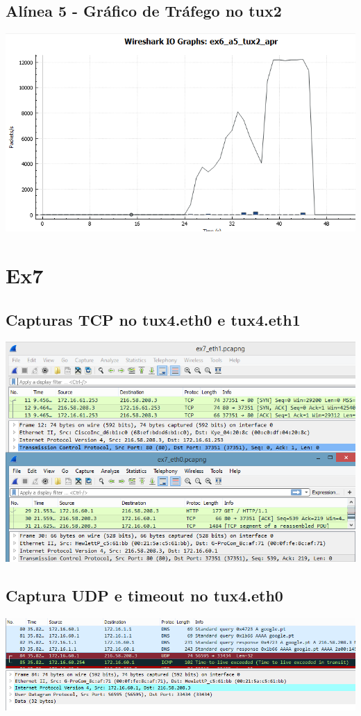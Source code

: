 \documentclass[11pt,a4paper,reqno]{report}
\numberwithin{equation}{section}
\begin{document}
\begin{appendices}
\subsection{Alínea 5 - Gráfico de Tráfego no tux2}
\label{ex6_a5_2io}
\includegraphics[width=18cm]{ex6_a5_tux2_IO.png}

\section{Ex7}%

\subsection{Capturas TCP no tux4.eth0 e tux4.eth1}
\label{ex7_tcp}
\includegraphics[width=18cm]{ex7_TCP.png}
\subsection{Captura UDP e timeout no tux4.eth0}
\label{ex7_udp}
\includegraphics[width=18cm]{ex7_udp_timeout.png}

\end{appendices}
\end{document}
